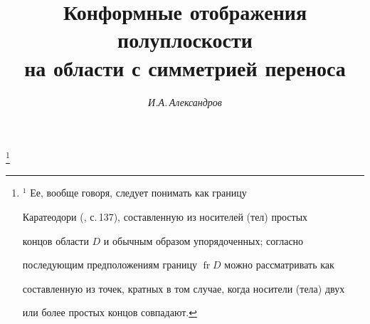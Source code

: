 

 




 


\newcommand{\fr}{\operatorname{fr}} 


\newcommand{\im}{\operatorname{Im}} 


\newcommand{\tts}[1]{} 


 




  


\setcounter{page}{15} 












\author{\it И.А.\,Александров} 




\title{Конформные отображения полуплоскости\\ 


на области с симметрией переноса} 


 


\thanks{$^1$ Ее, вообще говоря, следует понимать как границу 


Каратеодори (\cite{1}, с.\,137), составленную из носителей (тел) простых 


концов области $D$ и обычным образом упорядоченных; согласно 


последующим предположениям границу $\fr D$ можно рассматривать как 


составленную из точек, кратных в том случае, когда носители (тела) двух 


или более простых концов совпадают.} 


